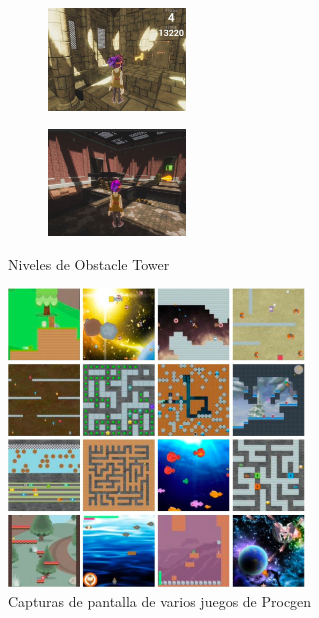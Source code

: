 \begin{figure}[ht!]
    \centering
    \begin{subfigure}
      \centering
      \includegraphics[width=0.4\textwidth]{Graphics/tower-1.jpeg}
      \label{fig:tower1}
    \end{subfigure}%
    \begin{subfigure}
      \centering
      \includegraphics[width=0.4\textwidth]{Graphics/tower-2.jpeg}
      \label{fig:tower2}
    \end{subfigure}%
    \caption{Niveles de Obstacle Tower}
    \label{fig:tower}
\end{figure}

\begin{figure}[ht!]
    \centering
    \includegraphics[width=0.7\textwidth]{Graphics/procgen.jpeg}
    \caption{Capturas de pantalla de varios juegos de Procgen}
    \label{fig:procgen}
\end{figure}

